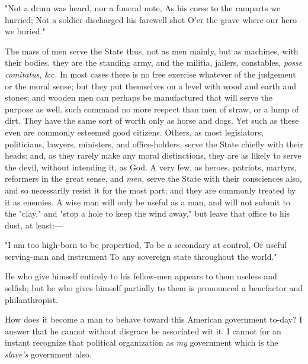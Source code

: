 \setupnarrower[left=24pt, right=24pt]
"Not a drum was heard, nor a funeral note,
As his corse to the ramparts we hurried;
Not a soldier discharged his farewell shot
O'er the grave where our hero we buried."
\stopnarrower
\par

The mass of men serve the State thus, not as men mainly, but as
machines, with their bodies. they are the standing army, and the
militia, jailers, constables, {\sl posse comitatus,} \&c. In most
cases there is no free exercise whatever of the judgement or the moral
sense; but they put themselves on a level with wood and earth and
stones; and wooden men can perhaps be manufactured that will serve the
purpose as well. such command no more respect than men of straw, or a
lump of dirt.  They have the same sort of worth only as horse and
dogs. Yet such as these even are commonly esteemed good citizens.
Others, as most legislators, politicians, lawyers, ministers, and
office-holders, serve the State chiefly with their heads: and, as they
rarely make any moral distinctions, they are as likely to serve the
devil, without intending it, as God. A very few, as heroes, patriots,
martyrs, reformers in the great sense, and {\sl men,} serve the State
with their consciences also, and so necessarily resist it for the
most part; and they are commonly treated by it as enemies. A wise man
will only be useful as a man, and will not submit to the "clay," and
"stop a hole to keep the wind away," but leave that office to his dust,
at least:---\par


\setupnarrower[left=24pt, right=24pt]
"I am too high-born to be propertied,
To be a secondary at control,
Or useful serving-man and instrument
To any sovereign state throughout the world."
\stopnarrower
\par

He who give himself entirely to his fellow-men appears to them useless
and selfish; but he who gives himself partially to them is pronounced
a benefactor and philanthropist.\par

How does it become a man to behave toward this American government
to-day? I answer that he cannot without disgrace be associated wit it.
I cannot for an instant recognize that political organization as {\sl
my} government which is the {\sl slave's} government also.\par


